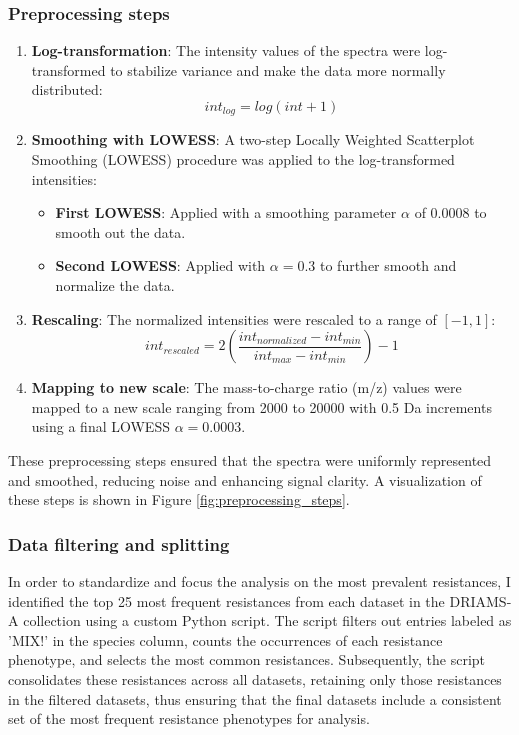 \documentclass[english,11pt,a4paper,titlepage]{article}
\begin{document}
	\subsubsection*{Preprocessing steps}
	\begin{enumerate}
		\item \textbf{Log-transformation}: The intensity values of the spectra were log-transformed to stabilize variance and make the data more normally distributed:
		\begin{equation*}
			int_{log} = log(int + 1)
		\end{equation*}
		\item \textbf{Smoothing with LOWESS}: A two-step Locally Weighted Scatterplot Smoothing (LOWESS) procedure was applied to the log-transformed intensities:
		\begin{itemize}
			\item \textbf{First LOWESS}: Applied with a smoothing parameter \( \alpha \) of \( 0.0008 \) to smooth out the data.
			\item \textbf{Second LOWESS}: Applied with \( \alpha = 0.3 \) to further smooth and normalize the data.
		\end{itemize}
		\item \textbf{Rescaling}: The normalized intensities were rescaled to a range of \( [-1, 1] \):
		\begin{equation}
			int_{rescaled} = 2 \left( \frac{int_{normalized} - int_{min}}{int_{max} - int_{min}} \right) - 1
		\end{equation}
		\item \textbf{Mapping to new scale}: The mass-to-charge ratio (m/z) values were mapped to a new scale ranging from 2000 to 20000 with 0.5 Da increments using a final LOWESS \( \alpha = 0.0003 \).
	\end{enumerate}
	These preprocessing steps ensured that the spectra were uniformly represented and smoothed, reducing noise and enhancing signal clarity. A visualization of these steps is shown in Figure \ref{fig:preprocessing_steps}.
	
	\subsubsection*{Data filtering and splitting}
	In order to standardize and focus the analysis on the most prevalent resistances, I identified the top 25 most frequent resistances from each dataset in the DRIAMS-A collection using a custom Python script. The script filters out entries labeled as 'MIX!' in the species column, counts the occurrences of each resistance phenotype, and selects the most common resistances. Subsequently, the script consolidates these resistances across all datasets, retaining only those resistances in the filtered datasets, thus ensuring that the final datasets include a consistent set of the most frequent resistance phenotypes for analysis.
	
\end{document}
